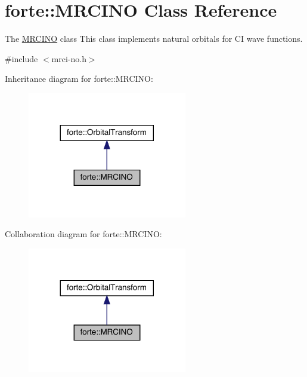 \hypertarget{classforte_1_1_m_r_c_i_n_o}{}\section{forte\+:\+:M\+R\+C\+I\+NO Class Reference}
\label{classforte_1_1_m_r_c_i_n_o}


The \mbox{\hyperlink{classforte_1_1_m_r_c_i_n_o}{M\+R\+C\+I\+NO}} class This class implements natural orbitals for CI wave functions.  




{\ttfamily \#include $<$mrci-\/no.\+h$>$}



Inheritance diagram for forte\+:\+:M\+R\+C\+I\+NO\+:
\nopagebreak
\begin{figure}[H]
\begin{center}
\leavevmode
\includegraphics[width=197pt]{classforte_1_1_m_r_c_i_n_o__inherit__graph}
\end{center}
\end{figure}


Collaboration diagram for forte\+:\+:M\+R\+C\+I\+NO\+:
\nopagebreak
\begin{figure}[H]
\begin{center}
\leavevmode
\includegraphics[width=197pt]{classforte_1_1_m_r_c_i_n_o__coll__graph}
\end{center}
\end{figure}
